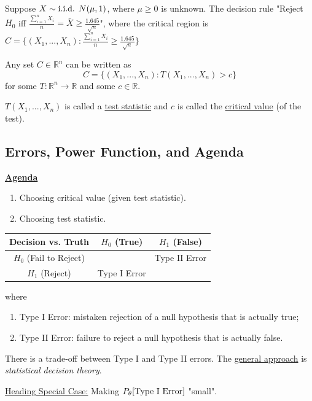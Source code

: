 \documentclass[11pt]{elegantbook}
\begin{document}
\begin{enumerate}[$\bullet$]
\begin{enumerate}
    \end{enumerate}
    \begin{example}
        Suppose $X\sim \textnormal{i.i.d. } N(\mu,1)$, where $\mu\geq 0$ is unknown. The decision rule "Reject $H_0$ iff $\frac{\sum_{i=1}^n X_i}{n}=\bar{X}\geq \frac{1.645}{\sqrt{n}}$", where the critical region is $C=\{(X_1,...,X_n):\frac{\sum_{i=1}^n X_i}{n}\geq \frac{1.645}{\sqrt{n}}\}$
    \end{example}
    \begin{proposition}
        Any set $C\in \mathbb{R}^n$ can be written as $$C=\{(X_1,...,X_n): T(X_1,...,X_n)>c\}$$ for some $T: \mathbb{R}^n \rightarrow \mathbb{R}$ and some $c\in \mathbb{R}$.
    \end{proposition}
    \begin{definition}
        \normalfont
        $T(X_1,...,X_n)$ is called a \underline{test statistic} and $c$ is called the \underline{critical value} (of the test).
    \end{definition}
\end{enumerate}

\subsection{Errors, Power Function, and Agenda}
\textbf{\underline{Agenda}}
\begin{enumerate}
    \item Choosing critical value (given test statistic).
    \item Choosing test statistic.
\end{enumerate}
\begin{definition}
    \normalfont
    \begin{center}
        \begin{tabular}{ccc}
            \hline
                Decision vs. Truth&$H_0$ (True) &$H_1$ (False)\\
            \hline
                $H_0$ (Fail to Reject)& &Type II Error\\
                $H_1$ (Reject)& Type I Error &\\
            \hline
        \end{tabular}
    \end{center}
    where
    \begin{enumerate}
        \item Type I Error: mistaken rejection of a null hypothesis that is actually true;
        \item Type II Error: failure to reject a null hypothesis that is actually false.
    \end{enumerate}
\end{definition}
There is a trade-off between Type I and Type II errors. The \underline{general approach} is \textit{statistical decision theory}.
\begin{example}
    \underline{Heading Special Case:} Making $P_\theta[\textnormal{Type I Error}]$ "small".
\end{example}
\end{document}
